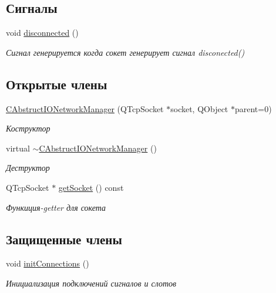 \subsection*{Сигналы}
\begin{DoxyCompactItemize}
\item 
\hypertarget{class_c_abstruct_i_o_network_manager_a4c25afd753612c5c719944a3e8ef4373}{}\label{class_c_abstruct_i_o_network_manager_a4c25afd753612c5c719944a3e8ef4373} 
void \hyperlink{class_c_abstruct_i_o_network_manager_a4c25afd753612c5c719944a3e8ef4373}{disconnected} ()
\begin{DoxyCompactList}\small\item\em Сигнал генерируется когда сокет генерирует сигнал disconected() \end{DoxyCompactList}\end{DoxyCompactItemize}
\subsection*{Открытые члены}
\begin{DoxyCompactItemize}
\item 
\hyperlink{class_c_abstruct_i_o_network_manager_a4ed201a3712ddf4ccd2135a0eb40fbf2}{C\+Abstruct\+I\+O\+Network\+Manager} (Q\+Tcp\+Socket $\ast$socket, Q\+Object $\ast$parent=0)
\begin{DoxyCompactList}\small\item\em Коструктор \end{DoxyCompactList}\item 
\hypertarget{class_c_abstruct_i_o_network_manager_ae6a3817e290e0ff8fcbf3d4c6830f5cd}{}\label{class_c_abstruct_i_o_network_manager_ae6a3817e290e0ff8fcbf3d4c6830f5cd} 
virtual \hyperlink{class_c_abstruct_i_o_network_manager_ae6a3817e290e0ff8fcbf3d4c6830f5cd}{$\sim$\+C\+Abstruct\+I\+O\+Network\+Manager} ()
\begin{DoxyCompactList}\small\item\em Деструктор \end{DoxyCompactList}\item 
Q\+Tcp\+Socket $\ast$ \hyperlink{class_c_abstruct_i_o_network_manager_a118a2c8254c149614cba51c42147c709}{get\+Socket} () const
\begin{DoxyCompactList}\small\item\em Функиция-\/getter для сокета \end{DoxyCompactList}\end{DoxyCompactItemize}
\subsection*{Защищенные члены}
\begin{DoxyCompactItemize}
\item 
void \hyperlink{class_c_abstruct_i_o_network_manager_ac01bfefacfa37050c8d3a9317a38fbf5}{init\+Connections} ()
\begin{DoxyCompactList}\small\item\em Инициализация подключений сигналов и слотов \end{DoxyCompactList}\end{DoxyCompactItemize}


